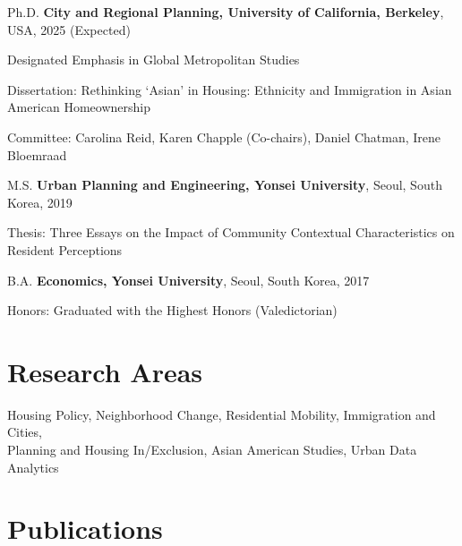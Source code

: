 \documentclass[12pt,letterpaper]{report}
\newcommand{\listitemspace}{0.4em}
\renewenvironment{itemize}
{\begin{list}{}{\setlength{\leftmargin}{0.5em}
                \setlength{\parskip}{0em}
                \setlength{\itemsep}{\listitemspace}
                \setlength{\parsep}{\listitemspace}}}
{\end{list}}
\begin{document}
    \begin{tablist}
      \item[Ph.D.] \tab{}\textbf{City and Regional Planning, University of California, Berkeley}, USA, 2025 (Expected)
        \item \tab{}Designated Emphasis in Global Metropolitan Studies
      \begin{itemize}
        \item Dissertation: Rethinking ‘Asian’ in Housing: Ethnicity and Immigration in Asian American Homeownership
        \vspace{-0.6em}
        \item Committee: Carolina Reid, Karen Chapple (Co-chairs), Daniel Chatman, Irene Bloemraad
      \end{itemize}
      \item[M.S.] \tab{}\textbf{Urban Planning and Engineering, Yonsei University}, Seoul, South Korea, 2019
      \begin{itemize}
        \item Thesis: Three Essays on the Impact of Community Contextual Characteristics on Resident Perceptions
    \end{itemize}
      \item[B.A.] \tab{}\textbf{Economics, Yonsei University}, Seoul, South Korea, 2017
      \begin{itemize}
        \item Honors: Graduated with the Highest Honors (Valedictorian)
      \end{itemize}
    \end{tablist}
    
    \section*{Research Areas}
      Housing Policy, Neighborhood Change, Residential Mobility, Immigration and Cities,\\
      Planning and Housing In/Exclusion, Asian American Studies, Urban Data Analytics
  
    \section*{Publications}
\end{document}

